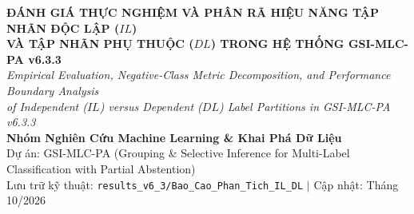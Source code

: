 \documentclass[10pt,a4paper]{article}
\begin{document}
\begin{center}
    {\LARGE\bfseries ĐÁNH GIÁ THỰC NGHIỆM VÀ PHÂN RÃ HIỆU NĂNG TẬP NHÃN ĐỘC LẬP ($IL$)\\ VÀ TẬP NHÃN PHỤ THUỘC ($DL$) TRONG HỆ THỐNG GSI-MLC-PA v6.3.3}\\[0.6em]
    {\large\textit{Empirical Evaluation, Negative-Class Metric Decomposition, and Performance Boundary Analysis\\ of Independent ($IL$) versus Dependent ($DL$) Label Partitions in GSI-MLC-PA v6.3.3}}\\[0.8em]
    {\textbf{Nhóm Nghiên Cứu Machine Learning \& Khai Phá Dữ Liệu}}\\[0.2em]
    {\small Dự án: GSI-MLC-PA (Grouping \& Selective Inference for Multi-Label Classification with Partial Abstention)}\\[0.1em]
    {\small Lưu trữ kỹ thuật: \texttt{results\_v6\_3/Bao\_Cao\_Phan\_Tich\_IL\_DL} \quad $\vert$ \quad Cập nhật: Tháng 10/2026}\\[0.8em]
\end{center}
\end{document}
